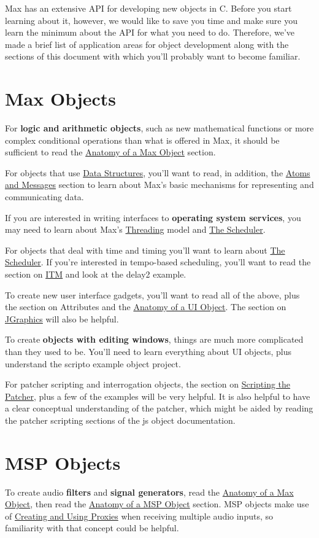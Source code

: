 Max has an extensive API for developing new objects in C. Before you start learning about it, however, we would like to save you time and make sure you learn the minimum about the API for what you need to do. Therefore, we've made a brief list of application areas for object development along with the sections of this document with which you'll probably want to become familiar.\hypertarget{main_chapter_roadmap_max_objects}{}\section{Max Objects}\label{main_chapter_roadmap_max_objects}
For {\bfseries logic and arithmetic objects}, such as new mathematical functions or more complex conditional operations than what is offered in Max, it should be sufficient to read the \hyperlink{chapter_anatomy}{Anatomy of a Max Object} section.

For objects that use \hyperlink{chapter_datastructures}{Data Structures}, you'll want to read, in addition, the \hyperlink{chapter_atoms}{Atoms and Messages} section to learn about Max's basic mechanisms for representing and communicating data.

If you are interested in writing interfaces to {\bfseries operating system services}, you may need to learn about Max's \hyperlink{chapter_threading}{Threading} model and \hyperlink{chapter_scheduler}{The Scheduler}.

For objects that deal with time and timing you'll want to learn about \hyperlink{chapter_scheduler}{The Scheduler}. If you're interested in tempo-\/based scheduling, you'll want to read the section on \hyperlink{chapter_itm}{ITM} and look at the delay2 example.

To create new user interface gadgets, you'll want to read all of the above, plus the section on Attributes and the \hyperlink{chapter_ui_anatomy}{Anatomy of a UI Object}. The section on \hyperlink{chapter_jgraphics}{JGraphics} will also be helpful.

To create {\bfseries objects with editing windows}, things are much more complicated than they used to be. You'll need to learn everything about UI objects, plus understand the scripto example object project.

For patcher scripting and interrogation objects, the section on \hyperlink{chapter_scripting}{Scripting the Patcher}, plus a few of the examples will be very helpful. It is also helpful to have a clear conceptual understanding of the patcher, which might be aided by reading the patcher scripting sections of the js object documentation.\hypertarget{main_chapter_roadmap_msp_objects}{}\section{MSP Objects}\label{main_chapter_roadmap_msp_objects}
To create audio {\bfseries filters} and {\bfseries signal generators}, read the \hyperlink{chapter_anatomy}{Anatomy of a Max Object}, then read the \hyperlink{chapter_msp_anatomy}{Anatomy of a MSP Object} section. MSP objects make use of \hyperlink{chapter_inout_chapter_inout_proxies}{Creating and Using Proxies} when receiving multiple audio inputs, so familiarity with that concept could be helpful.


